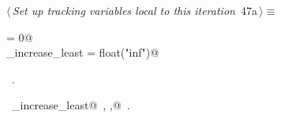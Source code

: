 \documentclass[11.5pt]{report}
\begin{document}
\begin{flushleft} \small\label{scrap69}\raggedright\small
{} $\langle\,${\itshape Set up tracking variables local to this iteration}\nobreak\ {\footnotesize {47a}}$\,\rangle\equiv$
\vspace{-1ex}
\begin{list}{}{} \item
\mbox{}\verb@ibest                = 0@\\
\mbox{}\verb@delta_increase_least = float("inf")@\\
\mbox{}\verb@@{\NWsep}
\end{list}
\vspace{-1.5ex}
\footnotesize
\begin{list}{}{\setlength{\itemsep}{-\parsep}\setlength{\itemindent}{-\leftmargin}}
\item \NWtxtMacroRefIn\ .
\item \NWtxtIdentsDefed\nobreak\  \verb@delta_increase_least@\nobreak\ , \verb@ibest,@\nobreak\ .
\item{}
\end{list}
\vspace{4ex}
\end{flushleft}

\vspace{-0.8cm}\newchunk 
\end{document}
